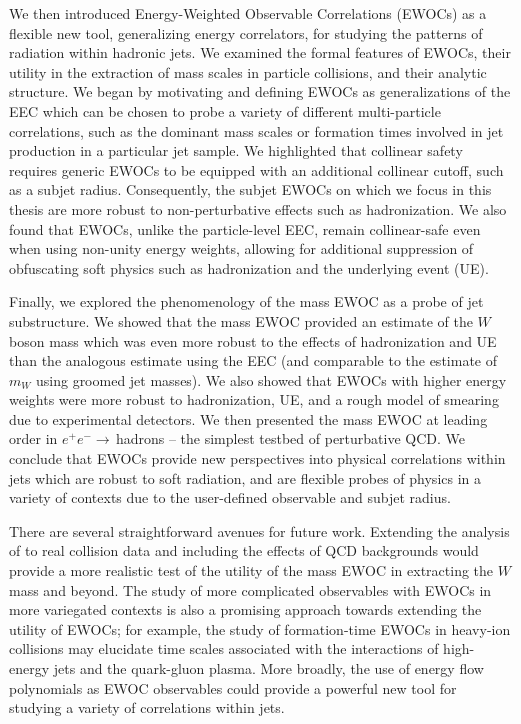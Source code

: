 We then introduced Energy-Weighted Observable Correlations (EWOCs) as a flexible new tool, generalizing energy correlators, for studying the patterns of radiation within hadronic jets.
%
We examined the formal features of EWOCs, their utility in the extraction of mass scales in particle collisions, and their analytic structure.
%
We began by motivating and defining EWOCs as generalizations of the EEC which can be chosen to probe a variety of different multi-particle correlations, such as the dominant mass scales or formation times involved in jet production in a particular jet sample.
%
We highlighted that collinear safety requires generic EWOCs to be equipped with an additional collinear cutoff, such as a subjet radius.
%
Consequently, the subjet EWOCs on which we focus in this thesis are more robust to non-perturbative effects such as hadronization.
%
We also found that EWOCs, unlike the particle-level EEC, remain collinear-safe even when using non-unity energy weights, allowing for additional suppression of obfuscating soft physics such as hadronization and the underlying event (UE).

Finally, we explored the phenomenology of the mass EWOC as a probe of jet substructure.
%
We showed that the mass EWOC provided an estimate of the \(W\) boson mass which was even more robust to the effects of hadronization and UE than the analogous estimate using the EEC (and comparable to the estimate of \(m_W\) using groomed jet masses).
%
We also showed that EWOCs with higher energy weights were more robust to hadronization, UE, and a rough model of smearing due to experimental detectors.
%
We then presented the mass EWOC at leading order in \(e^+ e^- \to\,\)hadrons -- the simplest testbed of perturbative QCD.
%
We conclude that EWOCs provide new perspectives into physical correlations within jets which are robust to soft radiation, and are flexible probes of physics in a variety of contexts due to the user-defined observable and subjet radius.

There are several straightforward avenues for future work.
%
Extending the analysis of  to real collision data and including the effects of QCD backgrounds would provide a more realistic test of the utility of the mass EWOC in extracting the \(W\) mass and beyond.
%
The study of more complicated observables with EWOCs in more variegated contexts is also a promising approach towards extending the utility of EWOCs;
%
for example, the study of formation-time EWOCs in heavy-ion collisions may elucidate time scales associated with the interactions of high-energy jets and the quark-gluon plasma.
%
More broadly, the use of energy flow polynomials \cite{Komiske:2017aww} as EWOC observables could provide a powerful new tool for studying a variety of correlations within jets.

